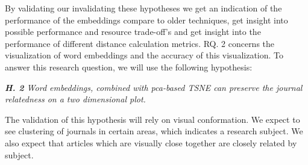 \documentclass[../../Thesis.tex]{subfiles}
\begin{document}
By validating our invalidating  these hypotheses we get an indication of the performance of the embeddings compare to older techniques,  get insight into possible performance and resource trade-off's and get insight into the performance of different distance calculation metrics. 
RQ. 2 concerns the visualization of word embeddings and the accuracy of this visualization. To answer this research question, we will use the following hypothesis:
\begin{jumpin}
\textit{\textbf{H. 2} Word embeddings, combined with pca-based TSNE can preserve the journal relatedness on a two dimensional plot.}
\end{jumpin}
The validation of this hypothesis will rely on visual conformation. We expect to see clustering of journals in certain areas, which indicates a research subject. We also expect that articles which are visually close together are closely related by subject. 
\end{document}
